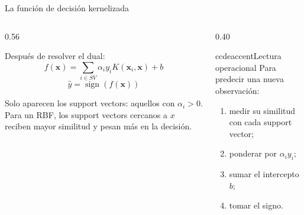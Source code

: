 \begin{frame}{La función de decisión kernelizada}
\footnotesize
\begin{columns}[T,onlytextwidth]
\begin{column}{0.56\textwidth}
\begin{ccdebox}
\centering
Después de resolver el dual:
\[
f(\mathbf x)=
\sum_{i\in SV}\alpha_i y_i K(\mathbf x_i,\mathbf x)+b
\]
\[
\hat y=\operatorname{sign}(f(\mathbf x))
\]
\end{ccdebox}
\vspace{0.12cm}
\begin{keybox}
Solo aparecen los support vectors: aquellos con $\alpha_i>0$. Para un RBF, los support vectors cercanos a $x$ reciben mayor similitud y pesan más en la decisión.
\end{keybox}
\end{column}
\begin{column}{0.40\textwidth}
\begin{contrastbox}{ccdeaccent}{Lectura operacional}
\footnotesize
Para predecir una nueva observación:
\begin{enumerate}
  \item medir su similitud con cada support vector;
  \item ponderar por $\alpha_i y_i$;
  \item sumar el intercepto $b$;
  \item tomar el signo.
\end{enumerate}
\end{contrastbox}
\end{column}
\end{columns}
\end{frame}

